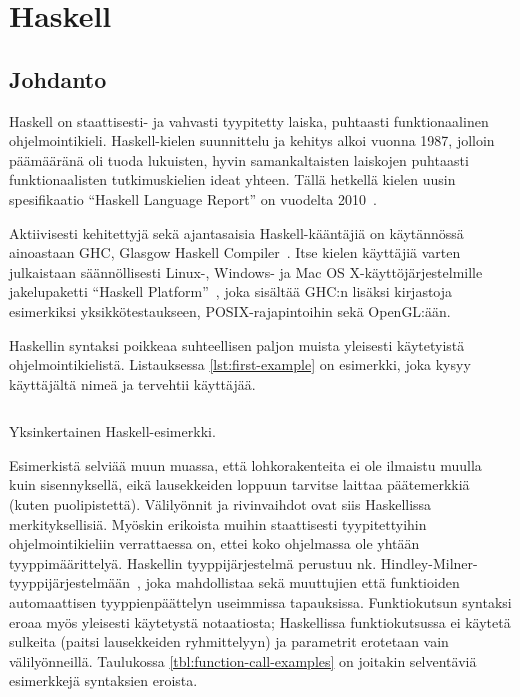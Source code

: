 \section{Haskell}
\subsection{Johdanto}
Haskell on staattisesti- ja vahvasti tyypitetty laiska, puhtaasti funktionaalinen ohjelmointikieli.
Haskell-kielen suunnittelu ja kehitys alkoi vuonna 1987,
jolloin päämääränä oli tuoda lukuisten, hyvin samankaltaisten laiskojen puhtaasti funktionaalisten tutkimuskielien ideat yhteen.
Tällä hetkellä kielen uusin spesifikaatio ``Haskell Language Report'' on vuodelta 2010~\cite{HaskellReport2010}.

Aktiivisesti kehitettyjä sekä ajantasaisia Haskell-kääntäjiä on käytännössä ainoastaan
GHC, Glasgow Haskell Compiler~\cite{GHC}.
Itse kielen käyttäjiä varten julkaistaan säännöllisesti Linux-, Windows- ja
Mac OS X-käyt\-tö\-jär\-jes\-tel\-mille  jakelupaketti ``Haskell Platform''~\cite{HaskellPlatform},
joka sisältää GHC:n lisäksi kirjastoja esimerkiksi yksikkötestaukseen, POSIX-rajapintoihin
sekä OpenGL:ään.

Haskellin syntaksi poikkeaa suhteellisen paljon muista yleisesti käytetyistä ohjelmointikielistä.
Listauksessa \ref{lst:first-example} on esimerkki,
joka kysyy käyttäjältä nimeä ja tervehtii käyttäjää.

\begin{listing}[H]
    \inputminted{haskell}{codes/FirstExample.hs}
    \label{lst:first-example}
    \caption{Yksinkertainen Haskell-esimerkki.}
\end{listing}

Esimerkistä selviää muun muassa, että lohkorakenteita ei ole ilmaistu muulla kuin sisennyksellä,
eikä lausekkeiden loppuun tarvitse laittaa päätemerkkiä (kuten puolipistettä).
Välilyönnit ja rivinvaihdot ovat siis Haskellissa merkityksellisiä.
Myöskin erikoista muihin staattisesti tyypitettyihin ohjelmointikieliin verrattaessa on,
ettei koko ohjelmassa ole yhtään tyyppimäärittelyä.
Haskellin tyyppijärjestelmä perustuu nk. Hindley-Milner-tyyppijärjestelmään~\cite{Hindley,Milner},
joka mahdollistaa sekä muuttujien että funktioiden automaattisen tyyppienpäättelyn useimmissa tapauksissa.
Funktiokutsun syntaksi eroaa myös yleisesti käytetystä notaatiosta;
Haskellissa funktiokutsussa ei käytetä sulkeita (paitsi lausekkeiden ryhmittelyyn) ja parametrit erotetaan vain välilyönneillä.
Taulukossa \ref{tbl:function-call-examples} on joitakin selventäviä esimerkkejä syntaksien eroista.

